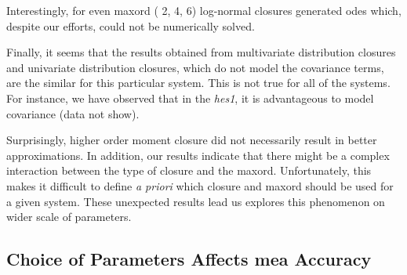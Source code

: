 Interestingly, for even \gls{maxord} (\ie{} 2, 4, 6) log-normal closures generated \gls{ode}s which, despite our efforts, could not be numerically solved.

Finally, it seems that the results obtained from multivariate distribution closures and univariate distribution closures,
 which do not model the covariance terms, are the similar for this particular system.
This is not true for all of the systems.
For instance, we have observed that in the \emph{hes1}, it is advantageous to model covariance (data not show).

Surprisingly, higher order moment closure did not necessarily result in better approximations.
In addition, our results indicate that there might be a complex interaction between the type of closure and the \gls{maxord}.
Unfortunately, this makes it difficult to define \emph{a priori} which closure and \gls{maxord} should be used for a given system.
These unexpected results lead us explores this phenomenon on wider scale of parameters.




\subsection{Choice of Parameters Affects \acrshort{mea} Accuracy}
\label{sec:hit-and-miss}

